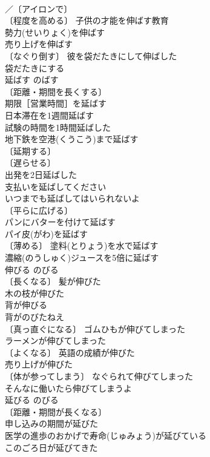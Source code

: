 \documentclass[8pt]{extreport}
\begin{document}
\begin{CJK}{UTF8}{min}
\\	／〔アイロンで〕
\\	〔程度を高める〕 子供の才能を伸ばす教育 
\\	勢力(せいりょく)を伸ばす 
\\	売り上げを伸ばす 
\\	〔なぐり倒す〕 彼を袋だたきにして伸ばした 
\\	袋だたきにする 
\\	延ばす	のばす	
\\	〔距離・期間を長くする〕
\\	期限［営業時間］を延ばす 
\\	日本滞在を1週間延ばす 
\\	試験の時間を1時間延ばした 
\\	地下鉄を空港(くうこう)まで延ばす 
\\	〔延期する〕
\\	〔遅らせる〕
\\	出発を2日延ばした 
\\	支払いを延ばしてください 
\\	いつまでも延ばしてはいられないよ 
\\	〔平らに広げる〕
\\	パンにバターを付けて延ばす 
\\	パイ皮(がわ)を延ばす 
\\	〔薄める〕 塗料(とりょう)を水で延ばす 
\\	濃縮(のうしゅく)ジュースを5倍に延ばす 
\\	伸びる	のびる	
\\	〔長くなる〕 髪が伸びた 
\\	木の枝が伸びた 
\\	背が伸びる 
\\	背がのびたねえ 
\\	〔真っ直ぐになる〕 ゴムひもが伸びてしまった 
\\	ラーメンが伸びてしまった 
\\	〔よくなる〕 英語の成績が伸びた 
\\	売り上げが伸びた 
\\	〔体が参ってしまう〕 なぐられて伸びてしまった 
\\	そんなに働いたら伸びてしまうよ 
\\	延びる	のびる	
\\	〔距離・期間が長くなる〕
\\	申し込みの期間が延びた 
\\	医学の進歩のおかげで寿命(じゅみょう)が延びている 
\\	このごろ日が延びてきた 

\end{CJK}
\end{document}
